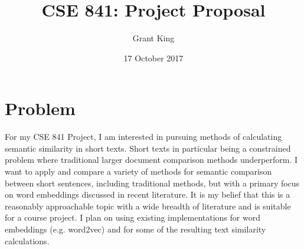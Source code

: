 \documentclass{sig-alternate-05-2015}
\begin{document}


\title{CSE 841: Project Proposal}
\author{
%
%
\alignauthor
Grant King\\
}
\date{17 October 2017}


\maketitle
\section{Problem}
For my CSE 841 Project, I am interested in pursuing methods of calculating semantic similarity in short texts. Short texts in particular being a constrained problem where traditional larger document comparison methods underperform\cite{SemanticSimilarity}. I want to apply and compare a variety of methods for semantic comparison between short sentences, including traditional methods, but with a primary focus on word embeddings discussed in recent literature\cite{ShortTextWord}. It is my belief that this is a reasonably approachable topic with a wide breadth of literature and is suitable for a course project. I plan on using existing implementations for word embeddings (e.g. word2vec) and for some of the resulting text similarity calculations.
\end{document}
